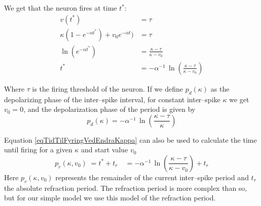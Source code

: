 We get that the neuron fires at time $t^*$:
\begin{equation}
	\begin{split}
			v(t^*) 					 							&= \tau \qquad 										\\	%
			\kappa (1-e^{-\alpha t^*}) + v_0 e^{-\alpha t})		&= \tau 											\\
			\ln \left(e^{-\alpha t^*}\right) 					&= \frac{\kappa - \tau}{\kappa - v_0} 					\\
			t^*													&= -\alpha^{-1} \, \ln \left( \frac{\kappa - \tau}{\kappa - v_0} \right) 					
	\end{split}
	\label{eqTidTilFyringVedEndraKappa}
\end{equation}

Where $\tau$ is the firing threshold of the neuron. 
If we define $p_d(\kappa)$ as the depolarizing phase of the inter--spike interval, for constant inter--spike $\kappa$ we get $v_0 = 0$, and the depolarization phase of the period is given by
\begin{equation}
	p_d(\kappa) = -\alpha^{-1} \, \ln(\frac{\kappa - \tau}{\kappa})
	\label{eqPeriodeligningForKonstIntraPeriodKAPPA}
\end{equation}

Equation \eqref{eqTidTilFyringVedEndraKappa} can also be used to calculate the time until firing for a given $\kappa$ and start value $v_0$
\begin{equation}
	p_{r}(\kappa, v_0) 	\;= t^* + t_r 
						\quad= -\alpha^{-1} \, \ln \left( \frac{\kappa - \tau}{\kappa - v_0} \right) + t_r
	\label{eqRemainderOfPeriod}
\end{equation}
Here $p_r(\kappa, v_0)$ represents the remainder of the current inter--spike period and $t_r$ the absolute refraction period. %
The refraction period is more complex than so, but for our simple model we use this model of the refraction period.


